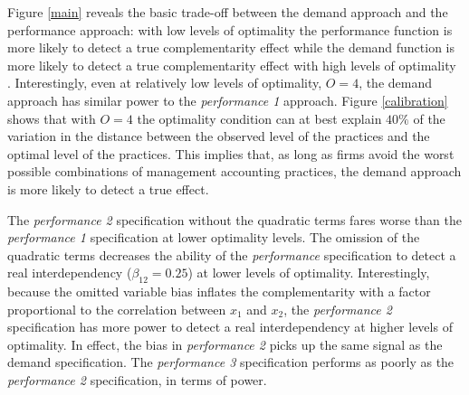 \documentclass[12pt]{article}
\begin{document}
Figure \ref{main} reveals the basic trade-off between the demand approach and the performance approach: with low levels of optimality the performance function is more likely to detect a true complementarity effect while the demand function is more likely to detect a true complementarity effect with high levels of optimality \citep{grabner_management_2013, aral_three-way_2012, johansson_testing_2018}. Interestingly, even at relatively low levels of optimality, $O = 4$, the demand approach has similar power to the \emph{performance 1} approach. Figure \ref{calibration} shows that with $O=4$ the optimality condition can at best explain $40\%$ of the variation in the distance between the observed level of the practices and the optimal level of the practices. This implies that, as long as firms avoid the worst possible combinations of management accounting practices, the demand approach is more likely to detect a true effect.

The \emph{performance 2} specification without the quadratic terms fares worse than the \emph{performance 1} specification at lower optimality levels. The omission of the quadratic terms decreases the ability of the \emph{performance} specification to detect a real interdependency ($\beta_{12} = 0.25$) at lower levels of optimality. Interestingly, because the omitted variable bias inflates the complementarity with a factor proportional to the correlation between $x_1$ and $x_2$, the \emph{performance 2} specification has more power to detect a real interdependency at higher levels of optimality. In effect, the bias in \emph{performance 2} picks up the same signal as the demand specification. The \emph{performance 3}  specification performs as poorly as the \emph{performance 2}  specification, in terms of power. 
\end{document}
